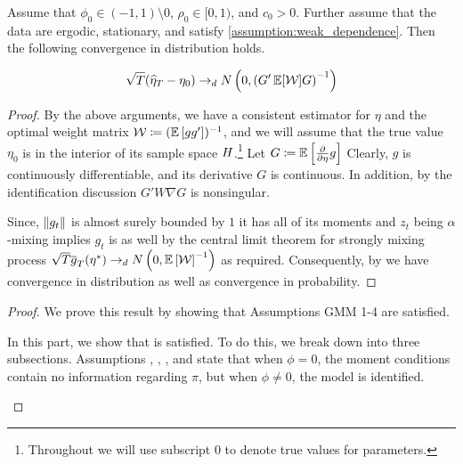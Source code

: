 \documentclass[11pt, letterpaper, twoside, final]{article}
\begin{document}
\begin{appendices}
\begin{theorem}
    Assume that $\phi_0  \in (-1,1) \setminus 0$, $\rho_0 \in [0,1)$, and $c_0 > 0$. 
    Further assume that the data are ergodic, stationary, and satisfy \cref{assumption:weak_dependence}.
    Then the following convergence in distribution holds.

    \begin{equation}
    \sqrt{T} (\widehat{\eta}_T - \eta_0) \dto \N\left(0, \left(G' \E[\W] G\right)^{-1}\right)
    \end{equation}
\end{theorem}

\begin{proof}

    By the above arguments, we have a consistent estimator for $\eta$ and the optimal weight matrix $\W \coloneqq
    (\E\left[g g'\right])^{-1}$, and we will assume that the true value $\eta_{0}$ is in the interior of its
    sample space $\Eta$.\footnote{Throughout we will use subscript \num{0}  to denote true values for parameters.}
    Let $G \coloneqq \E\left[\frac{\partial}{\partial \eta} \popmom \right]$ Clearly, $g$ is continuously
    differentiable, and its derivative $G$ is continuous.
    In addition, by the identification discussion $G' W \nabla G$ is nonsingular.
    

    Since, $\norm*{g_t}$ is almost surely bounded by $1$ it has all of its moments and $z_t$ being $\alpha$-mixing
    implies $g_t$ is as well by the central limit theorem for strongly mixing process $\sqrt{T} \sampmom(\eta^{*})
    \dto \N\left(0, \E\left[\W\right]^{-1}\right)$ as required. 
    Consequently, by \textcite[theorem 3.2]{newey1994large} we have convergence in distribution as well as
    convergence in probability.
    

\end{proof}


\InferenceWeakID*

\begin{proof}
We prove this result by showing that Assumptions GMM 1-4 are satisfied.

\begin{proofpart}
    \label{part:main_theorem_proof_part1}
    In this part, we show that  is satisfied. 
    To do this, we break   down into three subsections.
    Assumptions , , , and  state
    that when $\phi = 0$, the moment conditions contain no information regarding $\pi$, but when $\phi \neq 0$,
    the model is identified.
    

\end{proofpart}
\end{proof}
\end{appendices}
\end{document}
